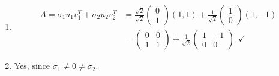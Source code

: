 {\begin{enumerate}
\begin{itemize}
$$		=\frac{1}{\sqrt{2}}\begin{pmatrix}1&-1\\\sqrt{2}&\sqrt{2}\end{pmatrix}=A~~\checkmark$$
	\end{itemize}
	\item 
	\begin{align*}
	A=\sigma_1u_1v_1^T+\sigma_2u_2v_2^T&=\frac{\sqrt{2}}{\sqrt{2}}\begin{pmatrix}0\\1\end{pmatrix}(1, 1)+\frac{1}{\sqrt{2}}\begin{pmatrix}1\\0\end{pmatrix}(1, -1)\\
	&=\begin{pmatrix}0&0\\1&1\end{pmatrix}+\frac{1}{\sqrt{2}}\begin{pmatrix}1&-1\\0&0\end{pmatrix}~~\checkmark
	\end{align*}
	\item 
	Yes, since $\sigma_1\neq0\neq\sigma_2$.
\end{enumerate}
}